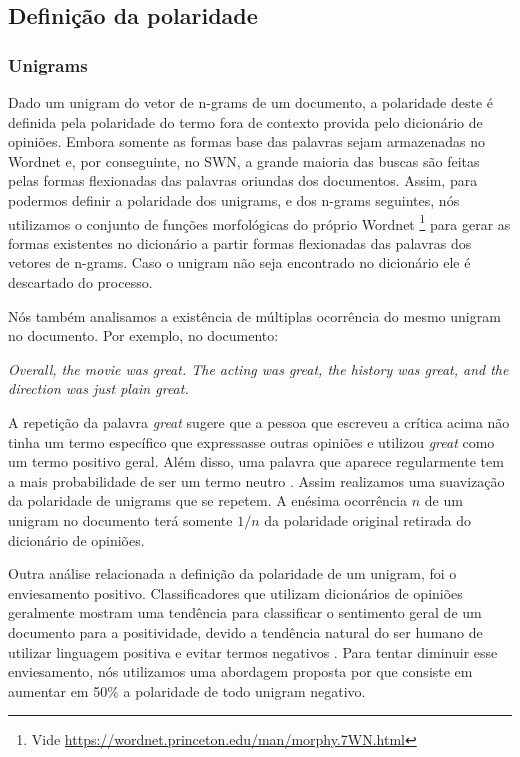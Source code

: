 \documentclass[template.tex]{subfiles}
\begin{document}
\subsection{Definição da polaridade}

\subsubsection{Unigrams}

Dado um unigram do vetor de n-grams de um documento, a polaridade deste é definida pela polaridade do termo fora de contexto provida pelo dicionário de opiniões. Embora somente as formas base das palavras sejam armazenadas no Wordnet e, por conseguinte, no SWN, a grande maioria das buscas são feitas pelas formas flexionadas das palavras oriundas dos documentos. Assim, para podermos definir a polaridade dos unigrams, e dos n-grams seguintes, nós utilizamos o conjunto de funções morfológicas do próprio Wordnet \footnote{Vide \url{https://wordnet.princeton.edu/man/morphy.7WN.html}} para gerar as formas existentes no dicionário a partir formas flexionadas das palavras dos vetores de n-grams. Caso o unigram não seja encontrado no dicionário ele é descartado do processo.

Nós também analisamos a existência de múltiplas ocorrência do mesmo unigram no documento. Por exemplo, no documento:

\textit{Overall, the movie was great. The acting was great, the history was great, and the direction was just plain great.}

A repetição da palavra \textit{great} sugere que a pessoa que escreveu a crítica acima não tinha um termo específico que expressasse outras opiniões e utilizou \textit{great} como um termo positivo geral. Além disso, uma palavra que aparece regularmente tem a mais probabilidade de ser um termo neutro \cite{taboada2011lexicon}. Assim realizamos uma suavização da polaridade de unigrams que se repetem. A enésima ocorrência $n$ de um unigram no documento terá somente $1/n$ da polaridade original retirada do dicionário de opiniões.

Outra análise relacionada a definição da polaridade de um unigram, foi o enviesamento positivo. Classificadores que utilizam dicionários de opiniões geralmente mostram uma tendência para classificar o sentimento geral de um documento para a positividade, devido a tendência natural do ser humano de utilizar linguagem positiva e evitar termos negativos \cite{boucher1969pollyanna, kennedy2006sentiment}. Para tentar diminuir esse enviesamento, nós utilizamos uma abordagem proposta por  que consiste em aumentar em 50\% a polaridade de todo unigram negativo. 
\end{document}
